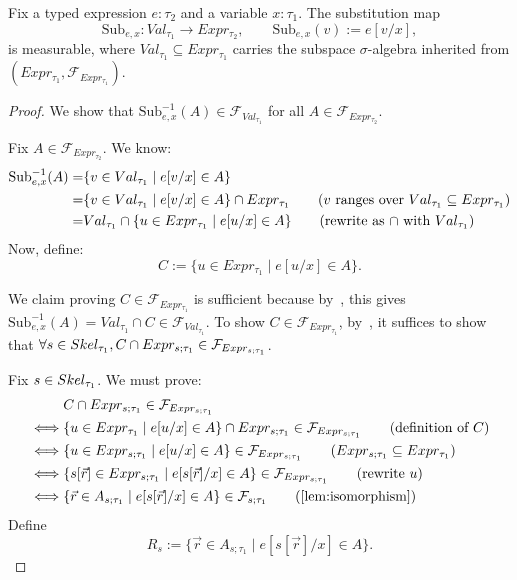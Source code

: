 \begin{lemma}\label{lem:subst-measurable}
    Fix a typed expression $e : \tau_2$ and a variable $x : \tau_1$. The substitution map
    \[
        \mathrm{Sub}_{e,x} \colon Val_{\tau_1} \to Expr_{\tau_2},
        \qquad
        \mathrm{Sub}_{e,x}(v) := e[v/x],
    \]
    is measurable, where $Val_{\tau_1} \subseteq Expr_{\tau_1}$ carries the subspace $\sigma$-algebra inherited
    from $(Expr_{\tau_1}, \mathcal{F}_{Expr_{\tau_1}})$.
\end{lemma}

\begin{proof}
	We show that $\mathrm{Sub}_{e,x}^{-1}(A) \in \mathcal{F}_{Val_{\tau_1}}$ for all $A \in \mathcal{F}_{Expr_{\tau_2}}$. 
	
	Fix $A \in \mathcal{F}_{Expr_{\tau_2}}$. We know:
	\begin{align*}
		\mathrm{Sub}_{e,x}^{-1}(A) = &\{v \in Val_{\tau_1} \mid e[v/x] \in A\} \\
		= &\{v \in Val_{\tau_1} \mid e[v/x] \in A\} \cap Expr_{\tau_1} \tag{$v$ ranges over $Val_{\tau_1} \subseteq Expr_{\tau_1}$}\\
		= &Val_{\tau_1} \cap \{u \in Expr_{\tau_1} \mid e[u/x] \in A\} \tag{rewrite as $\cap$ with $Val_{\tau_1}$}\\
	\end{align*}
	Now, define:
    \[
        C := \{u \in Expr_{\tau_1} \mid e[u/x] \in A\}.
    \]
	
	We claim proving $C \in \mathcal{F}_{Expr_{\tau_1}}$ is sufficient because by~, this gives $\mathrm{Sub}_{e,x}^{-1}(A) = Val_{\tau_1} \cap C \in \mathcal{F}_{Val_{\tau_1}}$. To show $C \in \mathcal{F}_{Expr_{\tau_1}}$, by~, it suffices to show that $\forall s \in Skel_{\tau_1}, C \cap Expr_{s;\tau_1} \in \mathcal{F}_{Expr_{s;\tau_1}}$. 
	
	Fix $s \in Skel_{\tau_1}$. We must prove:
	\begin{align*}
		&C \cap Expr_{s;\tau_1} \in \mathcal{F}_{Expr_{s;\tau_1}} \\
		\iff &\{u \in Expr_{\tau_1} \mid e[u/x] \in A\} \cap Expr_{s;\tau_1}\in \mathcal{F}_{Expr_{s;\tau_1}} \tag{definition of $C$} \\
		\iff &\{u \in Expr_{s; \tau_1} \mid e[u/x] \in A\} \in \mathcal{F}_{Expr_{s;\tau_1}}  \tag{$Expr_{s;\tau_1} \subseteq Expr_{\tau_1}$}\\
		\iff &\{s[\vec{r}] \in Expr_{s; \tau_1} \mid e[s[\vec{r}]/x] \in A\} \in \mathcal{F}_{Expr_{s;\tau_1}} \tag{rewrite $u$}\\
		\iff &\{\vec{r} \in A_{s;\tau_1} \mid e[s[\vec{r}]/x] \in A\} \in \mathcal{F}_{s;\tau_1} \tag{\Cref{lem:isomorphism}}
	\end{align*}
	Define
    \[
        R_s := \{\vec{r} \in A_{s;\tau_1} \mid e[s[\vec{r}]/x] \in A\}.
    \]


\end{proof}
